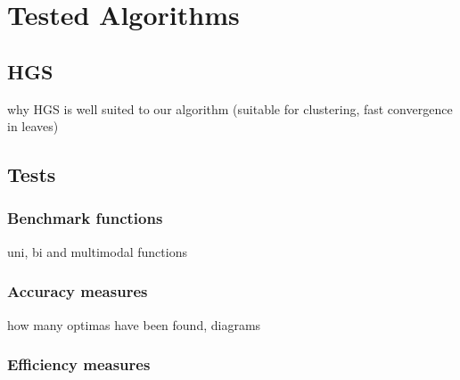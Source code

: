 
\chapter{Tested Algorithms}
\label{TestedAlgorithms}


\section{HGS}
why HGS is well suited to our algorithm (suitable for clustering, fast
convergence in leaves)

\section{Tests}

\subsection{Benchmark functions}
uni, bi and multimodal functions

\subsection{Accuracy measures}
how many optimas have been found,
diagrams

\subsection{Efficiency measures}




